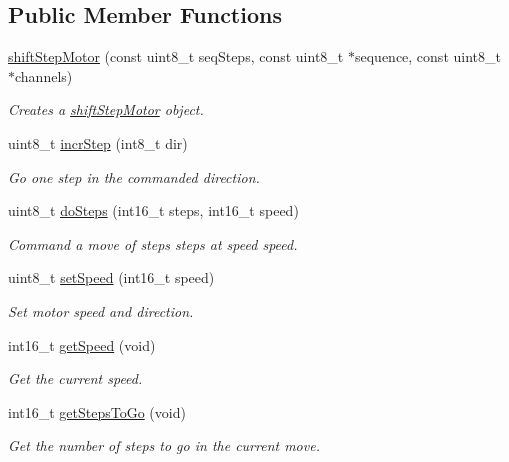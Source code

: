 \subsection*{Public Member Functions}
\begin{DoxyCompactItemize}
\item 
\hyperlink{classshift_step_motor_aee8974e1496495ce45c7b43d0b42c464}{shiftStepMotor} (const uint8\_\-t seqSteps, const uint8\_\-t $\ast$sequence, const uint8\_\-t $\ast$channels)
\begin{DoxyCompactList}\small\item\em Creates a \hyperlink{classshift_step_motor}{shiftStepMotor} object. \item\end{DoxyCompactList}\item 
uint8\_\-t \hyperlink{classshift_step_motor_a463d9926c5bb4db38cea1a5d56c2c391}{incrStep} (int8\_\-t dir)
\begin{DoxyCompactList}\small\item\em Go one step in the commanded direction. \item\end{DoxyCompactList}\item 
uint8\_\-t \hyperlink{classshift_step_motor_aa93008b0f0485302d0512b85e9680df1}{doSteps} (int16\_\-t steps, int16\_\-t speed)
\begin{DoxyCompactList}\small\item\em Command a move of steps steps at speed speed. \item\end{DoxyCompactList}\item 
uint8\_\-t \hyperlink{classshift_step_motor_adc24feb4fba5e88460623f95f7c377e2}{setSpeed} (int16\_\-t speed)
\begin{DoxyCompactList}\small\item\em Set motor speed and direction. \item\end{DoxyCompactList}\item 
int16\_\-t \hyperlink{classshift_step_motor_a04f4a1dd0f970ea4937a3171ca965604}{getSpeed} (void)
\begin{DoxyCompactList}\small\item\em Get the current speed. \item\end{DoxyCompactList}\item 
int16\_\-t \hyperlink{classshift_step_motor_a1dcfe79646ef64dc6e97ff5488e68548}{getStepsToGo} (void)
\begin{DoxyCompactList}\small\item\em Get the number of steps to go in the current move. \item\end{DoxyCompactList}\item 

\end{DoxyCompactItemize}
